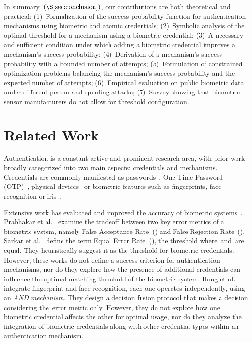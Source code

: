 \documentclass[conference,compsoc]{IEEEtran}
\begin{document}
In summary~$(\S\ref{sec:conclusion})$, our contributions are both theoretical and practical: (1)~Formalization of the success probability function for authentication mechanisms using biometric and atomic credentials; (2)~Symbolic analysis of the optimal threshold for a mechanism using a biometric credential; (3)~A necessary and sufficient condition under which adding a biometric credential improves a mechanism’s success probability; (4)~Derivation of a mechanism's success probability with a bounded number of attempts; (5)~Formulation of constrained optimization problems balancing the mechanism's success probability and the expected number of attempts; (6)~Empirical evaluation on public biometric data under different-person and spoofing attacks; (7)~Survey showing that biometric sensor manufacturers do not allow for threshold configuration.

\section{Related Work}\label{sec:related}
\noindent
Authentication is a constant active and prominent research area, with prior work broadly categorized into two main aspects: credentials and mechanisms. Credentials are commonly manifested as passwords~\cite{password1979}, One-Time-Password (OTP)~\cite{otp2017}, physical devices~\cite{FIDO2021} or biometric features such as fingerprints, face recognition or iris~\cite{anil2004}. 

Extensive work has evaluated and improved the accuracy of biometric systems~\cite{Cappelli2006,Maio2002,Anil1997,LivDet2009,LivDet2011,LivDet2013,LivDet2015}. Prabhakar et al.~\cite{prabhakar2003} examine the tradeoff between two key error metrics of a biometric system, namely False Acceptance Rate~(\FAR) and False Rejection Rate~(\FRR). Sarkar et al.~\cite{sarkar2020} define the term Equal Error Rate~(\EER), the threshold where~\FAR and~\FRR are equal. They heuristically suggest it as the threshold for biometric credentials. However, these works do not define a success criterion for authentication mechanisms, nor do they explore how the presence of additional credentials can influence the optimal matching threshold of the biometric system. Hong et al.~\cite{hong1998} integrate fingerprint and face recognition, each one operates independently, using an \emph{AND mechanism}. They design a decision fusion protocol that makes a decision considering the~\FAR error metric only. However, they do not explore how one biometric credential affects the other for optimal usage, nor do they analyze the integration of biometric credentials along with other credential types within an authentication mechanism.
\end{document}
